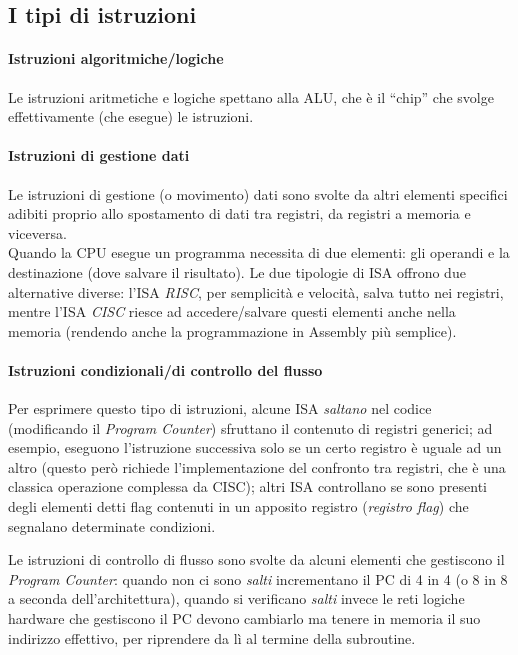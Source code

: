\documentclass[class=book, crop=false, oneside]{standalone}
\begin{document}
\subsection{I tipi di istruzioni}

\paragraph*{Istruzioni algoritmiche/logiche}
Le istruzioni aritmetiche e logiche spettano alla ALU, che è il “chip” che svolge effettivamente (che esegue) le istruzioni.

\paragraph*{Istruzioni di gestione dati}
Le istruzioni di gestione (o movimento) dati sono svolte da altri elementi specifici adibiti proprio allo spostamento di dati tra registri, da registri a memoria  e viceversa.\\
Quando la CPU esegue un programma necessita di due elementi: gli operandi e la destinazione (dove salvare il risultato). Le due tipologie di ISA offrono due alternative diverse: l’ISA \emph{RISC}, per semplicità  e velocità, salva tutto nei registri, mentre l’ISA \emph{CISC} riesce ad accedere/salvare questi elementi anche nella memoria (rendendo anche la programmazione in Assembly più semplice).

\paragraph*{Istruzioni condizionali/di controllo del flusso}
Per esprimere questo tipo di istruzioni, alcune ISA \emph{saltano} nel codice (modificando il \emph{Program Counter}) sfruttano il contenuto di registri generici; ad esempio, eseguono l’istruzione successiva solo se un certo registro è uguale ad un altro (questo però richiede l’implementazione del confronto tra registri, che è una classica operazione complessa da CISC); altri ISA controllano se sono presenti  degli elementi detti flag contenuti in un apposito registro (\emph{registro flag}) che segnalano determinate condizioni.

Le istruzioni di controllo di flusso sono svolte da alcuni elementi che gestiscono il \emph{Program Counter}: quando non ci sono \emph{salti} incrementano il PC di 4 in 4 (o 8 in 8 a seconda dell’architettura), quando si verificano \emph{salti} invece le reti logiche hardware che gestiscono il PC devono cambiarlo ma tenere in memoria il suo indirizzo effettivo, per riprendere da lì al termine della subroutine.
\end{document}
